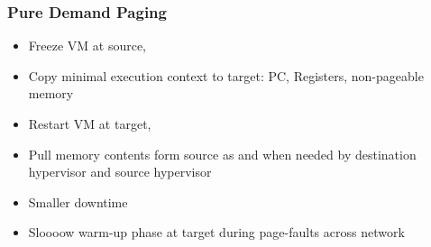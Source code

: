 \documentclass[12pt]{article}
\begin{document}
\subsubsection{Pure Demand Paging}
\begin{itemize}
    \item Freeze VM at source, 
    \item Copy minimal execution context to target: PC, Registers, non-pageable memory
    \item Restart VM at target, 
    \item Pull memory contents form source as and when needed by destination hypervisor and source hypervisor
    \item Smaller downtime 
    \item Sloooow warm-up phase at target during page-faults across network
\end{itemize}
\end{document}
